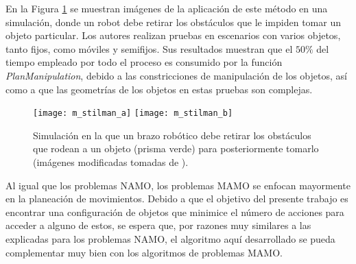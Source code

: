 En la Figura \ref{fig:4209604} se muestran imágenes de la aplicación de este método en una simulación, donde un robot debe retirar los obstáculos que le impiden tomar un objeto particular.
Los autores realizan pruebas en escenarios con varios objetos, tanto fijos, como móviles y semifijos.
Sus resultados muestran que el $50\%$ del tiempo empleado por todo el proceso es consumido por la función \textit{PlanManipulation}, debido a las constricciones de manipulación de los objetos, así como a que las geometrías de los objetos en estas pruebas son complejas.
%
\begin{figure}[H]
	\texttt{[image: m\_stilman\_a]}%
	\hspace{0.5cm}%
	\texttt{[image: m\_stilman\_b]}%
	\caption{Simulación en la que un brazo robótico debe retirar los obstáculos que rodean a un objeto (prisma verde) para posteriormente tomarlo (imágenes modificadas tomadas de \cite{4209604}).}
	\label{fig:4209604}
\end{figure}
%
Al igual que los problemas NAMO, los problemas MAMO se enfocan mayormente en la planeación de movimientos.
Debido a que el objetivo del presente trabajo es encontrar una configuración de objetos que minimice el número de acciones para acceder a alguno de estos, se espera que, por razones muy similares a las explicadas para los problemas NAMO, el algoritmo aquí desarrollado se pueda complementar muy bien con los algoritmos de problemas MAMO.
%
%
%
%

